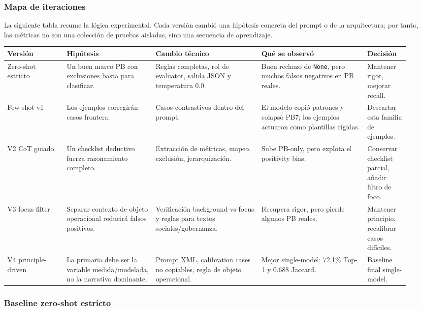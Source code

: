 \subsubsection{Mapa de iteraciones}

La siguiente tabla resume la lógica experimental. Cada versión cambió una hipótesis concreta del prompt o de la arquitectura; por tanto, las métricas no son una colección de pruebas aisladas, sino una secuencia de aprendizaje.

\begin{center}
\scriptsize
\setlength{\tabcolsep}{3pt}
\renewcommand{\arraystretch}{1.18}
\begin{tabular}{p{0.14\linewidth}p{0.21\linewidth}p{0.25\linewidth}p{0.25\linewidth}p{0.10\linewidth}}
\toprule
Versión & Hipótesis & Cambio técnico & Qué se observó & Decisión \\
\midrule
Zero-shot estricto & Un buen marco PB con exclusiones basta para clasificar. & Reglas completas, rol de evaluator, salida JSON y temperatura 0.0. & Buen rechazo de \texttt{None}, pero muchos falsos negativos en PB reales. & Mantener rigor, mejorar recall. \\
Few-shot v1 & Los ejemplos corregirán casos frontera. & Casos contrastivos dentro del prompt. & El modelo copió patrones y colapsó PB7; los ejemplos actuaron como plantillas rígidas. & Descartar esta familia de ejemplos. \\
V2 CoT guiado & Un checklist deductivo fuerza razonamiento completo. & Extracción de métricas, mapeo, exclusión, jerarquización. & Sube PB-only, pero explota el positivity bias. & Conservar checklist parcial, añadir filtro de foco. \\
V3 focus filter & Separar contexto de objeto operacional reducirá falsos positivos. & Verificación background-vs-focus y reglas para textos sociales/gobernanza. & Recupera rigor, pero pierde algunos PB reales. & Mantener principio, recalibrar casos difíciles. \\
V4 principle-driven & La primaria debe ser la variable medida/modelada, no la narrativa dominante. & Prompt XML, calibration cases no copiables, regla de objeto operacional. & Mejor single-model: 72.1\% Top-1 y 0.688 Jaccard. & Baseline final single-model. \\
\bottomrule
\end{tabular}
\end{center}

\subsubsection{Baseline zero-shot estricto}

